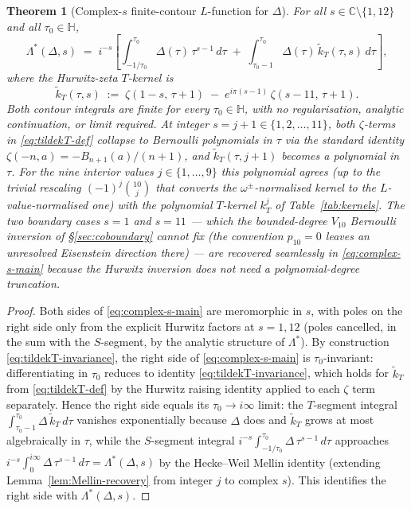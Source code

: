 \documentclass[11pt,letterpaper]{article}
\newtheorem{theorem}{Theorem}[section]
\newcommand{\HH}{\mathbb{H}}
\newcommand{\CC}{\mathbb{C}}
\begin{document}
\begin{theorem}[Complex-$s$ finite-contour $L$-function for $\Delta$]\label{thm:complex-s}
For all $s \in \CC \setminus \{1, 12\}$ and all $\tau_0 \in \HH$,
\begin{equation}\label{eq:complex-s-main}
  \boxed{\;\;
  \Lambda^*(\Delta, s) \;=\; i^{-s}\!\left[\int_{-1/\tau_0}^{\tau_0}\!\Delta(\tau)\,\tau^{s-1}\,d\tau
  \;+\; \int_{\tau_0 - 1}^{\tau_0}\!\Delta(\tau)\,\widetilde{k}_T(\tau, s)\,d\tau\right],
  \;\;}
\end{equation}
where the Hurwitz-zeta $T$-kernel is
\begin{equation}\label{eq:tildekT-def}
  \widetilde{k}_T(\tau, s) \;:=\; \zeta(1 - s,\,\tau + 1) \;-\; e^{i\pi(s-1)}\,\zeta(s - 11,\,\tau + 1).
\end{equation}
Both contour integrals are finite for every $\tau_0 \in \HH$, with no regularisation, analytic continuation, or limit required.  At integer $s = j + 1 \in \{1, 2, \ldots, 11\}$, both $\zeta$-terms in \eqref{eq:tildekT-def} collapse to Bernoulli polynomials in $\tau$ via the standard identity $\zeta(-n, a) = -B_{n+1}(a)/(n+1)$, and $\widetilde{k}_T(\tau, j+1)$ becomes a polynomial in $\tau$.  For the nine interior values $j \in \{1, \ldots, 9\}$ this polynomial agrees (up to the trivial rescaling $(-1)^j\binom{10}{j}$ that converts the $\omega^\pm$-normalised kernel to the $L$-value-normalised one) with the polynomial $T$-kernel $k_T^j$ of Table~\ref{tab:kernels}.  The two boundary cases $s = 1$ and $s = 11$ --- which the bounded-degree $V_{10}$ Bernoulli inversion of \S\ref{sec:coboundary} cannot fix (the convention $p_{10} = 0$ leaves an unresolved Eisenstein direction there) --- are recovered seamlessly in \eqref{eq:complex-s-main} because the Hurwitz inversion does not need a polynomial-degree truncation.
\end{theorem}

\begin{proof}
Both sides of \eqref{eq:complex-s-main} are meromorphic in $s$, with poles on the right side only from the explicit Hurwitz factors at $s = 1, 12$ (poles cancelled, in the sum with the $S$-segment, by the analytic structure of $\Lambda^*$).  By construction \eqref{eq:tildekT-invariance}, the right side of \eqref{eq:complex-s-main} is $\tau_0$-invariant: differentiating in $\tau_0$ reduces to identity \eqref{eq:tildekT-invariance}, which holds for $\widetilde{k}_T$ from \eqref{eq:tildekT-def} by the Hurwitz raising identity applied to each $\zeta$ term separately.  Hence the right side equals its $\tau_0 \to i\infty$ limit: the $T$-segment integral $\int_{\tau_0-1}^{\tau_0}\!\Delta\,\widetilde{k}_T\,d\tau$ vanishes exponentially because $\Delta$ does and $\widetilde{k}_T$ grows at most algebraically in $\tau$, while the $S$-segment integral $i^{-s}\int_{-1/\tau_0}^{\tau_0}\!\Delta\,\tau^{s-1}\,d\tau$ approaches $i^{-s}\int_0^{i\infty}\!\Delta\,\tau^{s-1}\,d\tau = \Lambda^*(\Delta, s)$ by the Hecke--Weil Mellin identity (extending Lemma~\ref{lem:Mellin-recovery} from integer $j$ to complex $s$).  This identifies the right side with $\Lambda^*(\Delta, s)$.
\end{proof}
\end{document}
